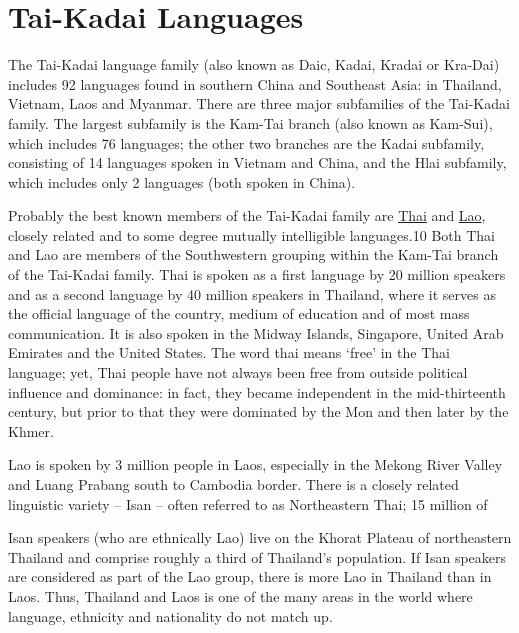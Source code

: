 \section{Tai-Kadai Languages }
\label{s:tai-kadai}
The Tai-Kadai language family (also known as Daic, Kadai, Kradai
or Kra-Dai) includes 92 languages found in southern China and Southeast Asia:
in Thailand, Vietnam, Laos and Myanmar. There are three major subfamilies of
the Tai-Kadai family. The largest subfamily is the Kam-Tai branch (also known
as Kam-Sui), which includes 76 languages; the other two branches are the Kadai
subfamily, consisting of 14 languages spoken in Vietnam and China, and the Hlai
subfamily, which includes only 2 languages (both spoken in China).

Probably the best known members of the Tai-Kadai family are \hyperref[s:thai]{Thai} and \hyperref[s:lao]{Lao},
closely related and to some degree mutually intelligible languages.10 Both Thai
and Lao are members of the Southwestern grouping within the Kam-Tai branch
of the Tai-Kadai family. Thai is spoken as a first language by 20 million speakers
and as a second language by 40 million speakers in Thailand, where it serves
as the official language of the country, medium of education and of most mass
communication. It is also spoken in the Midway Islands, Singapore, United Arab
Emirates and the United States. The word thai means ‘free’ in the Thai language;
yet, Thai people have not always been free from outside political influence and
dominance: in fact, they became independent in the mid-thirteenth century, but
prior to that they were dominated by the Mon and then later by the Khmer.

Lao is spoken by 3 million people in Laos, especially in the Mekong River
Valley and Luang Prabang south to Cambodia border. There is a closely related
linguistic variety – Isan – often referred to as Northeastern Thai; 15 million of


Isan speakers (who are ethnically Lao) live on the Khorat Plateau of northeastern
Thailand and comprise roughly a third of Thailand’s population. If Isan speakers
are considered as part of the Lao group, there is more Lao in Thailand than in
Laos. Thus, Thailand and Laos is one of the many areas in the world where
language, ethnicity and nationality do not match up.

